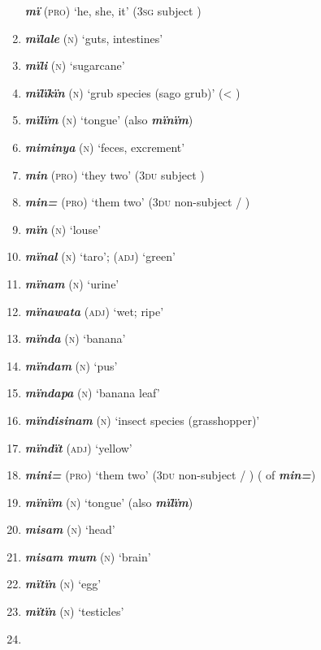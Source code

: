 \begin{enumerate}[noitemsep, label={}, align=left, widest=190, labelsep=1ex,leftmargin=*,itemindent=-10pt]
\textbf{\textit{mï}} (\textsc{pro}) ‘he, she, it’ (3\textsc{sg} subject ) \item
\textbf{\textit{mïlale}} (\textsc{n}) ‘guts, intestines’ \item
\textbf{\textit{mïli}} (\textsc{n}) ‘sugarcane’ \item
\textbf{\textit{mïlïkïn}} (\textsc{n}) ‘grub species (sago grub)’ (< ) \item
\textbf{\textit{mïlïm}} (\textsc{n}) ‘tongue’ (also \textbf{\textit{mïnïm}}) \item
\textbf{\textit{miminya}} (\textsc{n}) ‘feces, excrement’ \item
\textbf{\textit{min}} (\textsc{pro}) ‘they two’ (3\textsc{du} subject ) \item
\textbf{\textit{min=}} (\textsc{pro}) ‘them two’ (3\textsc{du} non-subject  /  ) \item
\textbf{\textit{mïn}} (\textsc{n}) ‘louse’ \item
\textbf{\textit{mïnal}} (\textsc{n}) ‘taro’; (\textsc{adj}) ‘green’ \item
\textbf{\textit{mïnam}} (\textsc{n}) ‘urine’ \item
\textbf{\textit{mïnawata}} (\textsc{adj}) ‘wet; ripe’ \item
\textbf{\textit{mïnda}} (\textsc{n}) ‘banana’ \item
\textbf{\textit{mïndam}} (\textsc{n}) ‘pus’ \item
\textbf{\textit{mïndapa}} (\textsc{n}) ‘banana leaf’ \item
\textbf{\textit{mïndisinam}} (\textsc{n}) ‘insect species (grasshopper)’ \item
\textbf{\textit{mïndït}} (\textsc{adj}) ‘yellow’ \item
\textbf{\textit{mini=}} \textsc{(pro}) ‘them two’ (3\textsc{du} non-subject  /  ) \linebreak( of \textbf{\textit{min=}}) \item
\textbf{\textit{mïnïm}} (\textsc{n}) ‘tongue’ (also \textbf{\textit{mïlïm}}) \item
\textbf{\textit{misam}} (\textsc{n}) ‘head’ \item
\textbf{\textit{misam mum}} (\textsc{n}) ‘brain’ \item
\textbf{\textit{mïtïn}} (\textsc{n}) ‘egg’ \item
\textbf{\textit{mïtïn}} (\textsc{n}) ‘testicles’ \item

\end{enumerate}
